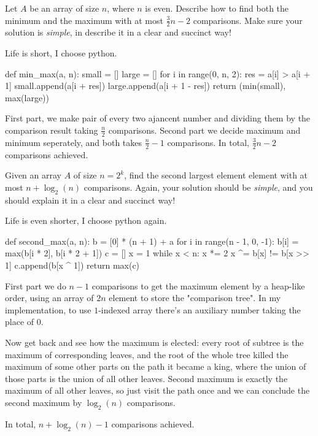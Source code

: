 \documentclass[11pt,a4paper,oneside]{article}
\begin{document}
\begin{problem}{2}
	\statement
	Let $A$ be an array of size $n$, where $n$ is even. 
	Describe how to find both the minimum and the maximum
	with at most $\frac{3}{2} n  - 2$ comparisons.
	Make sure your solution is {\em simple}, in describe it 
	in a clear and succinct way!

	\solution
	Life is short, I choose python.
\begin{python}
def min_max(a, n):
    small = []
    large = []
    for i in range(0, n, 2):
        res = a[i] > a[i + 1]
        small.append(a[i + res])
        large.append(a[i + 1 - res])
    return (min(small), max(large))
\end{python}
	First part, we make pair of every two ajancent number and dividing them by the comparison result taking $\frac n 2$ comparisons.
	Second part we decide maximum and minimum seperately, and both takes $\frac n 2 - 1$ comparisons. In total, $\frac {3} {2} n - 2$ comparisons achieved.
\end{problem}
\begin{problem}{3}
	\statement
	Given an array $A$ of size $n = 2^k$, find the second largest element element
	with at most $n + \log_2(n)$ comparisons. 
	Again, your solution should be {\em simple}, and you should explain
	it in a clear and succinct way!
	
	\solution
	Life is even shorter, I choose python again.
\begin{python}
def second_max(a, n):
    b = [0] * (n + 1) + a
    for i in range(n - 1, 0, -1):
        b[i] = max(b[i * 2], b[i * 2 + 1])
    c = []
    x = 1
    while x < n:
        x *= 2
        x ^= b[x] != b[x >> 1]
        c.append(b[x ^ 1])
    return max(c)
\end{python}
	First part we do $n - 1$ comparisons to get the maximum element by a heap-like order, using an array of $2n$ element to store the "comparison tree". In my implementation, to use $1$-indexed array there's an auxiliary number taking the place of $0$.

	Now get back and see how the maximum is elected: every root of subtree is the maximum of corresponding leaves, and the root of the whole tree killed the maximum of some other parts on the path it became a king, where the union of those parts is the union of all other leaves. Second maximum is exactly the maximum of all other leaves, so just visit the path once and we can conclude the second maximum by $\log_2(n)$ comparisons.

	In total, $n + \log_2(n) - 1$ comparisons achieved.
\end{problem}
\end{document}
